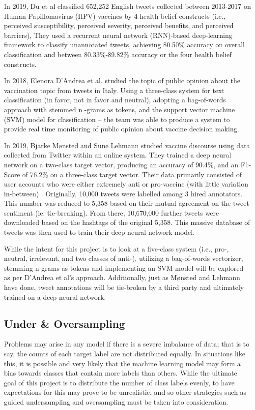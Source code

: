 \documentclass[12pt]{article}
\begin{document}
In 2019, Du et al classified 652,252 English tweets collected between 2013-2017 on Human Papillomavirus (HPV) vaccines by 4 health belief constructs (i.e., perceived susceptibility, perceived severity, perceived benefits, and perceived barriers), They used a recurrent neural network (RNN)-based deep-learning framework to classify unannotated tweets, achieving 80.50\% accuracy on overall classification and between 80.33\%-89.82\% accuracy or the four health belief constructs.   

In 2018, Elenora D’Andrea et al. studied the topic of public opinion about the vaccination topic from tweets in Italy. Using a three-class system for text classification (in favor, not in favor and neutral), adopting a bag-of-words approach with stemmed n -grams as tokens, and the support vector machine (SVM) model for classification – the team was able to produce a system to provide real time monitoring of public opinion about vaccine decision making. \cite{elenora-etal-2018}

In 2019, Bjarke Mønsted and Sune Lehmann studied vaccine discourse using data collected from Twitter within an online system.  They trained a deep neural network on a two-class target vector, producing an accuracy of 90.4\%, and an F1-Score of 76.2\% on a three-class target vector.  Their data primarily consisted of user accounts who were either extremely anti or pro-vaccine (with little variation in-between) \cite{monsted-2019}.  Originally, 10,000 tweets were labelled among 3 hired annotators.  This number was reduced to 5,358 based on their mutual agreement on the tweet sentiment (ie. tie-breaking).  From there, 10,670,000 further tweets were downloaded based on the hashtags of the original 5,358.  This massive database of tweets was then used to train their deep neural network model.

While the intent for this project is to look at a five-class system (i.e., pro-, neutral, irrelevant, and two classes of anti-), utilizing a bag-of-words vectorizer, stemming n-grams as tokens and implementing an SVM model will be explored as per D’Andrea et al’s approach. Additionally, just as Mønsted and Lehmann have done, tweet annotations will be tie-broken by a third party and ultimately trained on a deep neural network.




\subsection{Under \& Oversampling}
Problems may arise in any model if there is a severe imbalance of data; that is to say, the counts of each target label are not distributed equally. In situations like this, it is possible and very likely that the machine learning model may form a bias towards classes that contain more labels than others.  While the ultimate goal of this project is to distribute the number of class labels evenly, to have expectations for this may prove to be unrealistic, and so other strategies such as guided undersampling and oversampling must be taken into consideration.  
\end{document}
